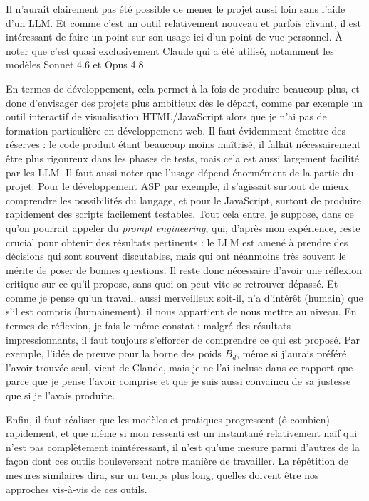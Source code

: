\documentclass[12pt, a4paper]{article}
\begin{document}
Il n'aurait clairement pas été possible de mener le projet aussi loin sans l'aide d'un LLM. Et comme c'est un outil relativement nouveau et parfois clivant, il est intéressant de faire un point sur son usage ici d'un point de vue personnel. À noter que c'est quasi exclusivement Claude qui a été utilisé, notamment les modèles Sonnet 4.6 et Opus 4.8. 

En termes de développement, cela permet à la fois de produire beaucoup plus, et donc d'envisager des projets plus ambitieux dès le départ, comme par exemple un outil interactif de visualisation HTML/JavaScript alors que je n'ai pas de formation particulière en développement web. Il faut évidemment émettre des réserves : le code produit étant beaucoup moins maîtrisé, il fallait nécessairement être plus rigoureux dans les phases de tests, mais cela est aussi largement facilité par les LLM.
Il faut aussi noter que l'usage dépend énormément de la partie du projet. Pour le développement ASP par exemple, il s'agissait surtout de mieux comprendre les possibilités du langage, et pour le JavaScript, surtout de produire rapidement des scripts facilement testables. Tout cela entre, je suppose, dans ce qu'on pourrait appeler du \emph{prompt engineering}, qui, d'après mon expérience, reste crucial pour obtenir des résultats pertinents : le LLM est amené à prendre des décisions qui sont souvent discutables, mais qui ont néanmoins très souvent le mérite de poser de bonnes questions. Il reste donc nécessaire d'avoir une réflexion critique sur ce qu'il propose, sans quoi on peut vite se retrouver dépassé. Et comme je pense qu'un travail, aussi merveilleux soit-il, n'a d'intérêt (humain) que s'il est compris (humainement), il nous appartient de nous mettre au niveau. 
En termes de réflexion, je fais le même constat : malgré des résultats impressionnants, il faut toujours s'efforcer de comprendre ce qui est proposé. Par exemple, l'idée de preuve pour la borne des poids $B_d$, même si j'aurais préféré l'avoir trouvée seul, vient de Claude, mais je ne l'ai incluse dans ce rapport que parce que je pense l'avoir comprise et que je suis aussi convaincu de sa justesse que si je l'avais produite.

Enfin, il faut réaliser que les modèles et pratiques progressent (ô combien) rapidement, et que même si mon ressenti est un instantané relativement naïf qui n'est pas complètement inintéressant, il n'est qu'une mesure parmi d'autres de la façon dont ces outils bouleversent notre manière de travailler. La répétition de mesures similaires dira, sur un temps plus long, quelles doivent être nos approches vis-à-vis de ces outils. 
\end{document}

